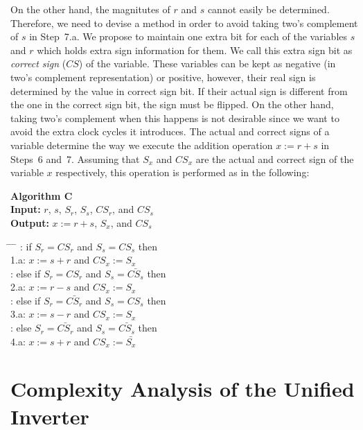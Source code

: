 \documentclass[twocolumn]{IEEEtran}
\begin{document}
On the other hand, the magnitutes of $r$ and $s$ cannot easily be 
determined. Therefore, we need to devise a method in order to avoid
taking two's complement of $s$ in Step~7.a. We propose
to maintain one extra bit for each of the variables $s$ and $r$ which 
holds extra sign information for them. We call this extra sign bit 
as {\it correct sign} ($CS$) of the variable. These variables can
be kept as negative (in two's complement representation) or positive, 
however, their real sign
is determined by the value in correct sign bit. If their actual 
sign is different from the one in the correct sign bit,
the sign must be flipped. On the other hand, taking two's complement
when this happens is not desirable since we want to avoid
the extra clock cycles it introduces. The actual and correct
signs of a variable determine the way we execute the
addition operation $x:=r+s$ in Steps~6 and~7. Assuming that
$S_x$ and $CS_x$ are the actual and correct sign of the variable
$x$ respectively, this operation is performed as in the following:

\medskip

\noindent \textbf{Algorithm C} \\
\textbf{Input:} $r$, $s$, $S_r$, $S_s$, $CS_r$, and $CS_s$ \\
\textbf{Output:} $x := r+s$, $S_x$, and $CS_s$

\begin{tabbing}
\hspace*{0cm} \= \hspace{0.5cm} \= \hspace{1ex} \hspace{1ex} \= \kill
{}:   \> if $S_r=CS_r$ and $S_s=CS_s$ then \\
\> 1.a: \> \> $x:=s+r$ and $CS_x:=S_x$ \\ 
:   \> else if $S_r=CS_r$ and $S_s=\bar{CS_s}$ then \\
\> 2.a: \> \> $x:=r-s$ and $CS_x:=S_x$ \\ 
:   \> else if $S_r=\bar{CS_r}$ and $S_s=CS_s$ then \\
\> 3.a: \> \> $x:=s-r$ and $CS_x:=S_x$ \\ 
:   \> else $S_r=\bar{CS_r}$ and $S_s=\bar{CS_s}$ then\\
\> 4.a: \> \> $x:=s+r$ and $CS_x:=\bar{S_x}$ 
\end{tabbing}

\section {Complexity Analysis of the Unified Inverter}
\end{document}
